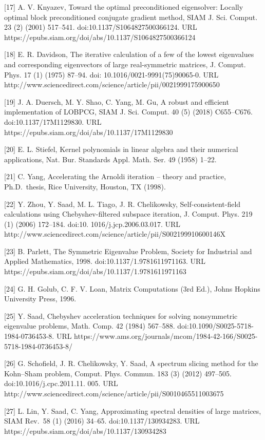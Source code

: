 \documentclass[
  10
]{article}
\begin{document}
{[}17{]} A. V. Knyazev, Toward the optimal preconditioned eigensolver:
Locally optimal block preconditioned conjugate gradient method, SIAM J.
Sci. Comput. 23 (2) (2001) 517--541. doi:10.1137/S1064827500366124. URL
https://epubs.siam.org/doi/abs/10.1137/S1064827500366124

{[}18{]} E. R. Davidson, The iterative calculation of a few of the
lowest eigenvalues and corresponding eigenvectors of large
real-symmetric matrices, J. Comput. Phys. 17 (1) (1975) 87--94. doi:
10.1016/0021-9991(75)90065-0. URL
http://www.sciencedirect.com/science/article/pii/0021999175900650

{[}19{]} J. A. Duersch, M. Y. Shao, C. Yang, M. Gu, A robust and
efficient implementation of LOBPCG, SIAM J. Sci. Comput. 40 (5) (2018)
C655--C676. doi:10.1137/17M1129830. URL
https://epubs.siam.org/doi/abs/10.1137/17M1129830

{[}20{]} E. L. Stiefel, Kernel polynomials in linear algebra and their
numerical applications, Nat. Bur. Standards Appl. Math. Ser. 49 (1958)
1--22.

{[}21{]} C. Yang, Accelerating the Arnoldi iteration -- theory and
practice, Ph.D.~thesis, Rice University, Houston, TX (1998).

{[}22{]} Y. Zhou, Y. Saad, M. L. Tiago, J. R. Chelikowsky,
Self-consistent-field calculations using Chebyshev-filtered subspace
iteration, J. Comput. Phys. 219 (1) (2006) 172--184. doi:10.
1016/j.jcp.2006.03.017. URL
http://www.sciencedirect.com/science/article/pii/S002199910600146X

{[}23{]} B. Parlett, The Symmetric Eigenvalue Problem, Society for
Industrial and Applied Mathematics, 1998. doi:10.1137/1.9781611971163.
URL https://epubs.siam.org/doi/abs/10.1137/1.9781611971163

{[}24{]} G. H. Golub, C. F. V. Loan, Matrix Computations (3rd Ed.),
Johns Hopkins University Press, 1996.

{[}25{]} Y. Saad, Chebyshev acceleration techniques for solving
nonsymmetric eigenvalue problems, Math. Comp. 42 (1984) 567--588.
doi:10.1090/S0025-5718-1984-0736453-8. URL
https://www.ams.org/journals/mcom/1984-42-166/S0025-5718-1984-0736453-8/

{[}26{]} G. Schofield, J. R. Chelikowsky, Y. Saad, A spectrum slicing
method for the Kohn--Sham problem, Comput. Phys. Commun. 183 (3) (2012)
497--505. doi:10.1016/j.cpc.2011.11. 005. URL
http://www.sciencedirect.com/science/article/pii/S0010465511003675

{[}27{]} L. Lin, Y. Saad, C. Yang, Approximating spectral densities of
large matrices, SIAM Rev.~58 (1) (2016) 34--65. doi:10.1137/130934283.
URL https://epubs.siam.org/doi/abs/10.1137/130934283
\end{document}
